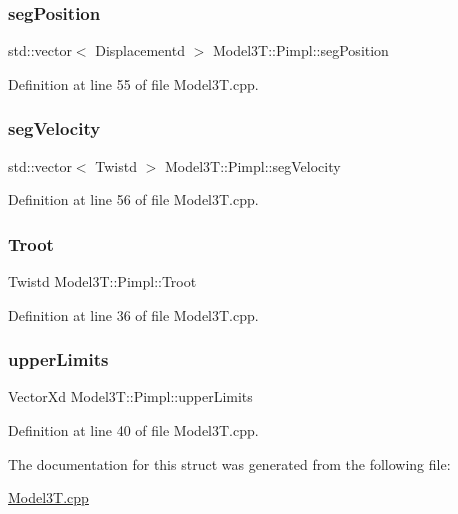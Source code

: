 \subsubsection{\texorpdfstring{seg\+Position}{segPosition}}
{\footnotesize\ttfamily std\+::vector$<$ Displacementd $>$ Model3\+T\+::\+Pimpl\+::seg\+Position}



Definition at line 55 of file Model3\+T.\+cpp.

\hypertarget{structModel3T_1_1Pimpl_a53fc477028c2bc87ee7c5e04879e8c20}{}\label{structModel3T_1_1Pimpl_a53fc477028c2bc87ee7c5e04879e8c20} 
\subsubsection{\texorpdfstring{seg\+Velocity}{segVelocity}}
{\footnotesize\ttfamily std\+::vector$<$ Twistd $>$ Model3\+T\+::\+Pimpl\+::seg\+Velocity}



Definition at line 56 of file Model3\+T.\+cpp.

\hypertarget{structModel3T_1_1Pimpl_a5b282557f05769af0f2e60709d348a43}{}\label{structModel3T_1_1Pimpl_a5b282557f05769af0f2e60709d348a43} 
\subsubsection{\texorpdfstring{Troot}{Troot}}
{\footnotesize\ttfamily Twistd Model3\+T\+::\+Pimpl\+::\+Troot}



Definition at line 36 of file Model3\+T.\+cpp.

\hypertarget{structModel3T_1_1Pimpl_a3b3b41e690971ea00156bdfefb813a5c}{}\label{structModel3T_1_1Pimpl_a3b3b41e690971ea00156bdfefb813a5c} 
\subsubsection{\texorpdfstring{upper\+Limits}{upperLimits}}
{\footnotesize\ttfamily Vector\+Xd Model3\+T\+::\+Pimpl\+::upper\+Limits}



Definition at line 40 of file Model3\+T.\+cpp.



The documentation for this struct was generated from the following file\+:\begin{DoxyCompactItemize}
\item 
\hyperlink{Model3T_8cpp}{Model3\+T.\+cpp}\end{DoxyCompactItemize}
